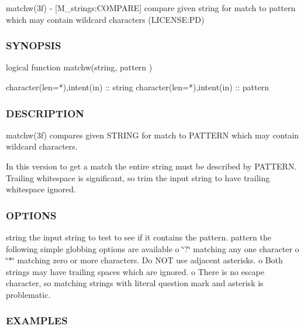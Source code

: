 matchw(3f) -\/ \mbox{[}M\+\_\+strings\+:C\+O\+M\+P\+A\+RE\mbox{]} compare given string for match to pattern which may contain wildcard characters (L\+I\+C\+E\+N\+SE\+:PD) 

\subsubsection*{S\+Y\+N\+O\+P\+S\+IS}

\begin{DoxyVerb}logical function matchw(string, pattern )

 character(len=*),intent(in) :: string
 character(len=*),intent(in) :: pattern
\end{DoxyVerb}
 \subsubsection*{D\+E\+S\+C\+R\+I\+P\+T\+I\+ON}

\begin{DoxyVerb}matchw(3f) compares given STRING for match to PATTERN which may
contain wildcard characters.

In this version to get a match the entire string must be described
by PATTERN. Trailing whitespace is significant, so trim the input
string to have trailing whitespace ignored.
\end{DoxyVerb}


\subsubsection*{O\+P\+T\+I\+O\+NS}

string the input string to test to see if it contains the pattern. pattern the following simple globbing options are available o \char`\"{}?\char`\"{} matching any one character o \char`\"{}$\ast$\char`\"{} matching zero or more characters. Do N\+OT use adjacent asterisks. o Both strings may have trailing spaces which are ignored. o There is no escape character, so matching strings with literal question mark and asterisk is problematic.

\subsubsection*{E\+X\+A\+M\+P\+L\+ES}

